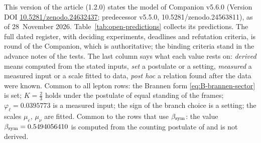 This version of the article (1.2.0) states the model of Companion v5.6.0 (Version DOI
\href{https://doi.org/10.5281/zenodo.24632437}{10.5281/zenodo.24632437}; predecessor v5.5.0, 10.5281/zenodo.24563811), as of
28~November 2026. Table~\ref{tab:open-predictions} collects its predictions. The full dated register, with deciding experiments, deadlines
and refutation criteria, is round  of the Companion, which is authoritative; the binding criteria stand in the advance notes
of the tests. The last column says what each value rests on: \emph{derived} means computed from the stated inputs, \emph{set} a postulate
or a setting, \emph{measured} a measured input or a scale fitted to data, \emph{post hoc} a relation found after the data were known.
Common to all lepton rows: the Brannen form \eqref{eq:B-brannen-sector} is set; $K=\tfrac23$ holds under the postulate of equal standing
of the frames; $\varphi_\ell=0.0395773$ is a measured input; the sign of the branch choice is a setting; the scales $\mu_e$, $\mu_\nu$
are fitted. Common to the rows that use $\beta_{\mathrm{sym}}$: the value $\beta_{\mathrm{sym}}=0.5494056410$ is computed from the counting postulate of 
and is not derived.

